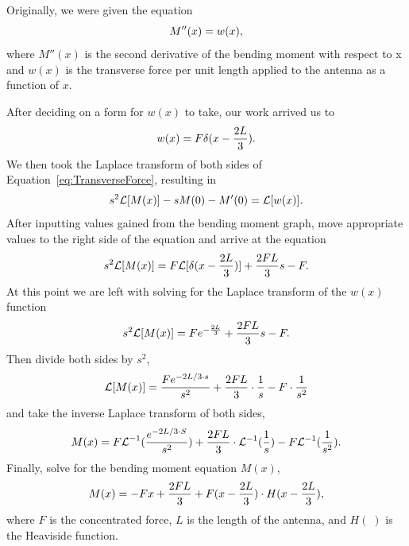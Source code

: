 \documentclass[12pt]{article}
\begin{document}
Originally, we were given the equation
\begin{equation}
    \centering
    M''(x) = w(x),
\end{equation}
where $M''(x)$ is the second derivative of the bending moment with respect to x and $w(x)$ is the transverse force per unit length applied to the antenna as a function of $x$.

After deciding on a form for $w(x)$  to take, our work arrived us to
\begin{equation}\label{eq:TransverseForce}
    \centering
    w(x) = F\delta(x - \frac{2L}{3}).
\end{equation}
We then took the Laplace transform of both sides of Equation~\eqref{eq:TransverseForce}, resulting in
\begin{equation}
    \centering
    s^2 \mathcal{L}[M(x)] - sM(0) - M'(0) = \mathcal{L}[w(x)].
\end{equation}
After inputting values gained from the bending moment graph, move appropriate values to the right side of the equation and arrive at the equation
\begin{equation}
    \centering
    s^2 \mathcal{L}[M(x)] = F\mathcal{L}[\delta(x - \frac{2L}{3})] + \frac{2FL}{3}{s} - F.
\end{equation}
At this point we are left with solving for the Laplace transform of the $w(x)$  function
\begin{equation}
    \centering
    s^2 \mathcal{L}[M(x)]=Fe^{-\frac{2L}{3}} + \frac{2FL}{3}{s} - F.
\end{equation}
Then divide both sides by $s^2$,
\begin{equation}
  \centering
  \mathcal{L}[M(x)] = \frac{Fe^{-2L/3 \cdot{s}}}{s^2} + \frac{2FL}{3} \cdot \frac{1}{s} - F \cdot \frac{1}{s^2}
  \end{equation}
 and take the inverse Laplace transform of both sides,
 \begin{equation}
  \centering
   M(x) = {F\mathcal{L}}^{-1}(\frac{e^{-2L/3 \cdot{S}}}{s^2}) + \frac{2FL}{3} \cdot \mathcal{L}^{-1}(\frac{1}{s})- F\mathcal{L}^{-1} (\frac{1}{s^2}).
  \end{equation}
 Finally, solve for the bending moment equation $M(x)$,
  \begin{equation}
  \centering
   M(x) = -Fx + \frac{2FL}{3} + F(x - \frac{2L}{3}) \cdot H(x - \frac{2L}{3}),
  \end{equation}
  where $F$ is the concentrated force, $L$ is the length of the antenna, and $H(\;)$ is the Heaviside function.
  
\end{document}
